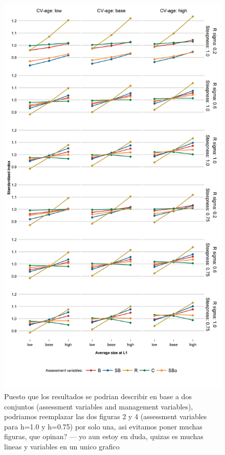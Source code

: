 \documentclass[11pt,letter,]{article}
\begin{document}
\begin{figure}[hbtp]
	\begin{center}
\includegraphics[width=0.70\columnwidth]{figures/steepness-tot-estado.png}
  \end{center}
\caption{Puesto que los resultados se podrian describir en base a dos conjuntos (assessment variables and management variables), podriamos reemplazar las dos figuras 2 y 4 (assessment variables para h=1.0 y h=0.75) por solo una, asi evitamos poner muchas figuras, que opinan? --- yo aun estoy en duda, quizas es muchas lineas y variables en un unico grafico}
\label{figureA}
\end{figure}
\end{document}
